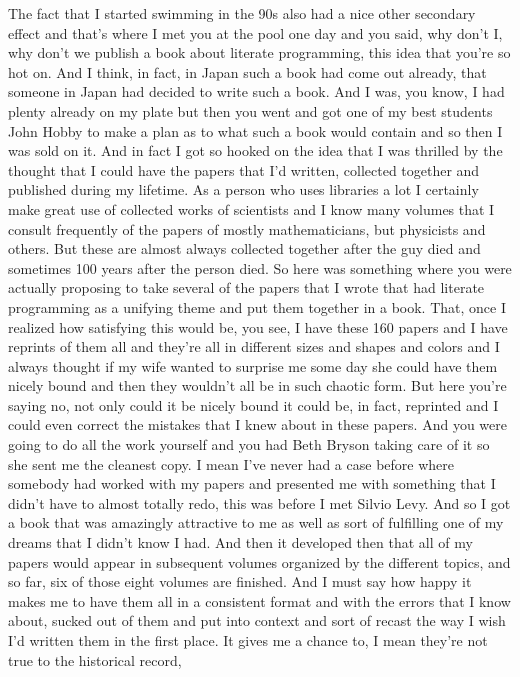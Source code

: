 \documentclass[]{article}
\begin{document}
The fact that I started swimming in the 90s also had a nice other
secondary effect and that's where I met you at the pool one day and you
said, why don't I, why don't we publish a book about literate
programming, this idea that you're so hot on. And I think, in fact, in
Japan such a book had come out already, that someone in Japan had
decided to write such a book. And I was, you know, I had plenty already
on my plate but then you went and got one of my best students John Hobby
to make a plan as to what such a book would contain and so then I was
sold on it. And in fact I got so hooked on the idea that I was thrilled
by the thought that I could have the papers that I'd written, collected
together and published during my lifetime. As a person who uses
libraries a lot I certainly make great use of collected works of
scientists and I know many volumes that I consult frequently of the
papers of mostly mathematicians, but physicists and others. But these
are almost always collected together after the guy died and sometimes
100 years after the person died. So here was something where you were
actually proposing to take several of the papers that I wrote that had
literate programming as a unifying theme and put them together in a
book. That, once I realized how satisfying this would be, you see, I
have these 160 papers and I have reprints of them all and they're all in
different sizes and shapes and colors and I always thought if my wife
wanted to surprise me some day she could have them nicely bound and then
they wouldn't all be in such chaotic form. But here you're saying no,
not only could it be nicely bound it could be, in fact, reprinted and I
could even correct the mistakes that I knew about in these papers. And
you were going to do all the work yourself and you had Beth Bryson
taking care of it so she sent me the cleanest copy. I mean I've never
had a case before where somebody had worked with my papers and presented
me with something that I didn't have to almost totally redo, this was
before I met Silvio Levy. And so I got a book that was amazingly
attractive to me as well as sort of fulfilling one of my dreams that I
didn't know I had. And then it developed then that all of my papers
would appear in subsequent volumes organized by the different topics,
and so far, six of those eight volumes are finished. And I must say how
happy it makes me to have them all in a consistent format and with the
errors that I know about, sucked out of them and put into context and
sort of recast the way I wish I'd written them in the first place. It
gives me a chance to, I mean they're not true to the historical record,
\end{document}
